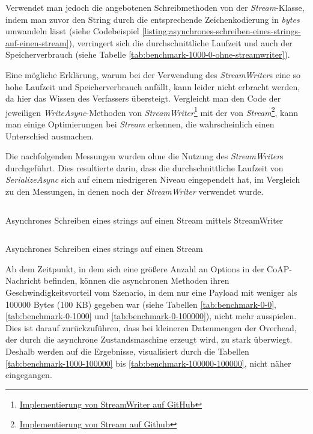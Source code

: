 Verwendet man jedoch die angebotenen Schreibmethoden von der \textit{Stream}-Klasse, indem man zuvor den String durch die entsprechende Zeichenkodierung in \textit{bytes} umwandeln lässt (siehe Codebeispiel \ref{listing:asynchrones-schreiben-eines-strings-auf-einen-stream}), verringert sich die durchschnittliche Laufzeit und auch der Speicherverbrauch (siehe Tabelle \ref{tab:benchmark-1000-0-ohne-streamwriter}).

Eine mögliche Erklärung, warum bei der Verwendung des \textit{StreamWriter}s eine so hohe Laufzeit und Speicherverbrauch anfällt, kann leider nicht erbracht werden, da hier das Wissen des Verfassers übersteigt. Vergleicht man den Code der jeweiligen \textit{WriteAsync}-Methoden von \textit{StreamWriter}\footnote{\href{https://github.com/microsoft/referencesource/blob/master/mscorlib/system/io/streamwriter.cs}{Implementierung von StreamWriter auf GitHub}} mit der von \textit{Stream}\footnote{\href{https://github.com/microsoft/referencesource/blob/master/mscorlib/system/io/stream.cs}{Implementierung von Stream auf Github}}, kann man einige Optimierungen bei \textit{Stream} erkennen, die wahrscheinlich einen Unterschied ausmachen.

Die nachfolgenden Messungen wurden ohne die Nutzung des \textit{StreamWriter}s durchgeführt. Dies resultierte darin, dass die durchschnittliche Laufzeit von \textit{SerializeAsync} sich auf einem niedrigeren Niveau eingependelt hat, im Vergleich zu den Messungen, in denen noch der \textit{StreamWriter} verwendet wurde.

\begin{listing}[h]
    \inputminted[framesep=2mm, baselinestretch=1.2, fontsize=\normalsize, linenos]{csharp}{codes/async_write_using_stream_writer.cs}
    \caption{Asynchrones Schreiben eines strings auf einen Stream mittels StreamWriter}
    \label{listing:asynchrones-schreiben-eines-strings-auf-einen-stream-streamwriter}
\end{listing}

\begin{listing}[h]
    \inputminted[framesep=2mm, baselinestretch=1.2, fontsize=\normalsize, linenos]{csharp}{codes/async_write_using_stream.cs}
    \caption{Asynchrones Schreiben eines strings auf einen Stream}
    \label{listing:asynchrones-schreiben-eines-strings-auf-einen-stream}
\end{listing}

Ab dem Zeitpunkt, in dem sich eine größere Anzahl an Options in der CoAP-Nachricht befinden, können die asynchronen Methoden ihren Geschwindigkeitsvorteil vom Szenario, in dem nur eine Payload mit weniger als 100000 Bytes (100 KB) gegeben war (siehe Tabellen \ref{tab:benchmark-0-0}, \ref{tab:benchmark-0-1000} und \ref{tab:benchmark-0-100000}), nicht mehr ausspielen. Dies ist darauf zurückzuführen, dass bei kleineren Datenmengen der Overhead, der durch die asynchrone Zustandsmaschine erzeugt wird, zu stark überwiegt. Deshalb werden auf die Ergebnisse, visualisiert durch die Tabellen \ref{tab:benchmark-1000-100000} bis \ref{tab:benchmark-100000-100000}, nicht näher eingegangen.

